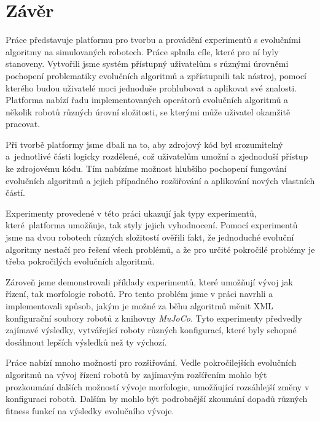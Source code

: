 \chapter*{Závěr}
Práce představuje platformu pro tvorbu a provádění experimentů s evolučními
algoritmy na simulovaných robotech. Práce splnila cíle, které pro ní byly
stanoveny. Vytvořili jsme systém přístupný uživatelům s různými úrovněmi
pochopení problematiky evolučních algoritmů a zpřístupnili tak nástroj, pomocí
kterého budou uživatelé moci jednoduše prohlubovat a aplikovat své znalosti.
Platforma nabízí řadu implementovaných operátorů evolučních algoritmů a několik
robotů různých úrovní složitosti, se kterými může uživatel okamžitě pracovat.

Při tvorbě platformy jsme dbali na to, aby zdrojový kód byl srozumitelný
a~jednotlivé části logicky rozdělené, což uživatelům umožní a zjednoduší
přístup ke zdrojovému kódu. Tím nabízíme možnost hlubšího pochopení fungování
evolučních algoritmů a jejich případného rozšiřování a aplikování nových
vlastních částí.

Experimenty provedené v této práci ukazují jak typy experimentů,
které~platforma umožňuje, tak styly jejich vyhodnocení. Pomocí experimentů jsme
na dvou robotech různých složitostí ověřili fakt, že jednoduché evoluční
algoritmy nestačí pro řešení všech problémů, a že pro určité pokročilé problémy
je třeba pokročilých evolučních algoritmů. 

Zároveň jsme demonstrovali příklady experimentů, které umožňují vývoj jak
řízení, tak morfologie robotů. Pro tento problém jsme v práci navrhli a
implementovali způsob, jakým je možné za běhu algoritmů měnit XML konfigurační
soubory robotů z knihovny \emph{MuJoCo}. Tyto experimenty předvedly zajímavé
výsledky, vytvářející roboty různých konfigurací, které byly schopné dosáhnout
lepších výsledků než ty výchozí.

Práce nabízí mnoho možností pro rozšiřování. Vedle pokročilejších evolučních
algoritmů na vývoj řízení robotů by zajímavým rozšířením mohlo být prozkoumání dalších
možností vývoje morfologie, umožňující rozsáhlejší změny v konfiguraci robotů.
Dalším by mohlo být podrobnější zkoumání dopadů různých fitness funkcí na
výsledky evolučního vývoje.

